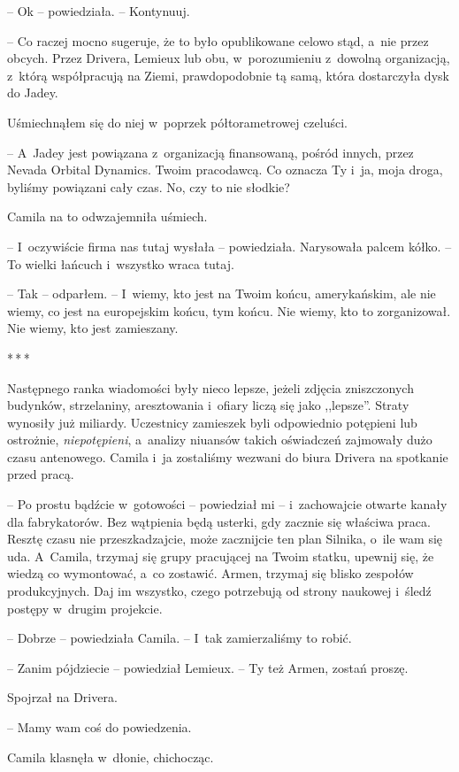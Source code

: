 \documentclass[oneside,polish,12pt,sfheadings]{mwbk}
\newcommand{\threeast}{\bigskip\par\centerline{*\,*\,*}\medskip\par}%
\begin{document}
-- Ok -- powiedziała. -- Kontynuuj.

-- Co raczej mocno sugeruje, że to było opublikowane celowo stąd, a~nie
przez obcych. Przez Drivera, Lemieux lub obu, w~porozumieniu z~dowolną
organizacją, z~którą współpracują na Ziemi, prawdopodobnie tą samą,
która dostarczyła dysk do Jadey.

Uśmiechnąłem się do niej w~poprzek półtorametrowej czeluści.

-- A~Jadey jest powiązana z~organizacją finansowaną, pośród innych, przez
Nevada Orbital Dynamics. Twoim pracodawcą. Co oznacza Ty i~ja, moja
droga, byliśmy powiązani cały czas. No, czy to nie słodkie?

Camila na to odwzajemniła uśmiech.

-- I~oczywiście firma nas tutaj wysłała -- powiedziała. Narysowała palcem
kółko. -- To wielki łańcuch i~wszystko wraca tutaj.

-- Tak -- odparłem. -- I~wiemy, kto jest na Twoim końcu, amerykańskim, ale
nie wiemy, co jest na europejskim końcu, tym końcu. Nie wiemy, kto to
zorganizował. Nie wiemy, kto jest zamieszany.

\threeast

Następnego ranka wiadomości były nieco lepsze, jeżeli zdjęcia
zniszczonych budynków, strzelaniny, aresztowania i~ofiary liczą się jako
,,lepsze''. Straty wynosiły już miliardy. Uczestnicy zamieszek byli
odpowiednio potępieni lub ostrożnie, \emph{niepotępieni}, a~analizy
niuansów takich oświadczeń zajmowały dużo czasu antenowego. Camila i~ja
zostaliśmy wezwani do biura Drivera na spotkanie przed pracą.

-- Po prostu bądźcie w~gotowości -- powiedział mi -- i~zachowajcie otwarte
kanały dla fabrykatorów. Bez wątpienia będą usterki, gdy zacznie się
właściwa praca. Resztę czasu nie przeszkadzajcie, może zacznijcie ten
plan Silnika, o~ile wam się uda. A~Camila, trzymaj się grupy pracującej
na Twoim statku, upewnij się, że wiedzą co wymontować, a~co zostawić.
Armen, trzymaj się blisko zespołów produkcyjnych. Daj im wszystko, czego
potrzebują od strony naukowej i~śledź postępy w~drugim projekcie.

-- Dobrze -- powiedziała Camila. -- I~tak zamierzaliśmy to robić.

-- Zanim pójdziecie -- powiedział Lemieux. -- Ty też Armen, zostań proszę.

Spojrzał na Drivera.

-- Mamy wam coś do powiedzenia.

Camila klasnęła w~dłonie, chichocząc.
\end{document}

